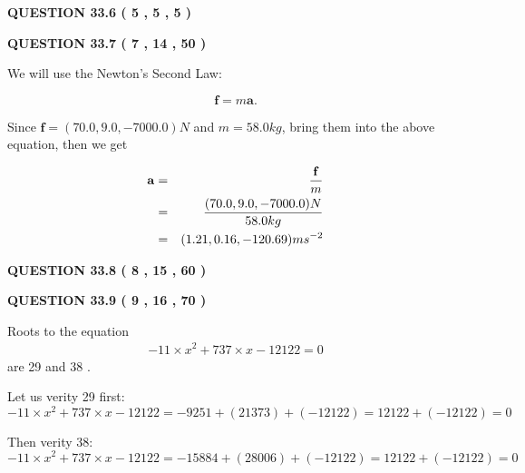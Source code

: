 \documentclass[12pt]{article}
\begin{document}
{\textbf{\Large{QUESTION
33.6 
 (           5 ,           5 ,           5 )
}}}
  
  
  
\vspace{0.2in}
  
{\textbf{\Large{QUESTION
33.7 
 (           7 ,          14 ,          50 )
}}}
  
  
 
 

We will use the Newton's Second Law:
 
\[
\mathbf{f}=m\mathbf{a}.
\]
 
Since $\mathbf{f}= %
(70.0 , 9.0 , -7000.0) N$
and $m= %
58.0kg$, bring them into the above equation, then we get
 
\begin{eqnarray*}
\mathbf{a}&=&\frac{\mathbf{f}}m  \\
&=&\frac{ %
(70.0 , 9.0 , -7000.0) N}{ %
58.0kg}  \\
&=& %
(1.21 , 0.16 , -120.69) ms^{-2}
\end{eqnarray*}
 
 
 
  
\vspace{0.2in}
  
{\textbf{\Large{QUESTION
33.8 
 (           8 ,          15 ,          60 )
}}}
  
  
 
 

 
 
  
\vspace{0.2in}
  
{\textbf{\Large{QUESTION
33.9 
 (           9 ,          16 ,          70 )
}}}
  
  


 
 

Roots to the equation
\begin{eqnarray*}
-11 \times x^2  %
+  %
737
                 \times x    %
-12122 =0
\end{eqnarray*}
are  %
29 and  %
38 .
 
Let us verity  %
29 first:
$  %
-11 \times x^2  %
+  %
737
                 \times x    %
-12122
  = %
-9251+( %
21373)+( %
-12122)
  = %
12122+( %
-12122)
  = %
0
$
 
Then verity  %
38:
$  %
-11 \times x^2  %
+  %
737
                 \times x    %
-12122
  = %
-15884+( %
28006)+( %
-12122)
  = %
12122+( %
-12122)
  = %
0
$
 
\end{document}
